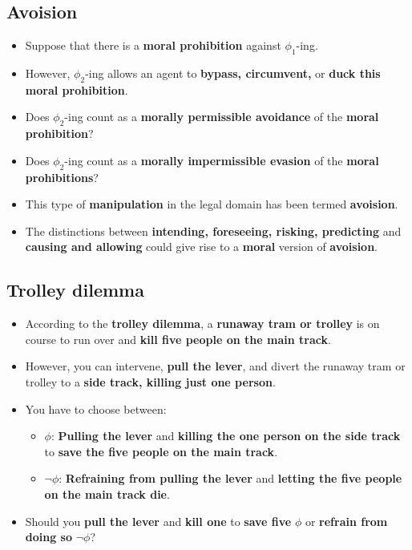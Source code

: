 \documentclass[11pt]{article}
\begin{document}
 \newpage
\subsection{Avoision}
\label{sec:org33f5b64}
\begin{itemize}
\item Suppose that there is a \textbf{moral prohibition} against \(\phi_1\)-ing.
\item However, \(\phi_2\)-ing allows an agent to \textbf{bypass, circumvent,} or \textbf{duck this moral prohibition}.
\item Does \(\phi_2\)-ing count as a \textbf{morally permissible avoidance} of the \textbf{moral prohibition}?
\item Does \(\phi_2\)-ing count as a \textbf{morally impermissible evasion} of the \textbf{moral prohibitions}?
\item This type of \textbf{manipulation} in the legal domain has been termed \textbf{avoision}.
\item The distinctions between \textbf{intending, foreseeing, risking, predicting} and \textbf{causing and allowing} could give rise to a \textbf{moral} version of \textbf{avoision}.
\end{itemize}
\subsection{Trolley dilemma}
\label{sec:org089fe1a}
\begin{itemize}
\item According to the \textbf{trolley dilemma}, a \textbf{runaway tram or trolley} is on course to run over and \textbf{kill five people on the main track}.
\item However, you can intervene, \textbf{pull the lever}, and divert the runaway tram or trolley to a \textbf{side track, killing just one person}.
\item You have to choose between:
\begin{itemize}
\item \(\phi\): \textbf{Pulling the lever} and \textbf{killing the one person on the side track} to \textbf{save the five people on the main track}.
\item \(\neg \phi\): \textbf{Refraining from pulling the lever} and \textbf{letting the five people on the main track die}.
\end{itemize}
\item Should you \textbf{pull the lever} and \textbf{kill one} to \textbf{save five} \(\phi\) or \textbf{refrain from doing so} \(\neg \phi\)?
\end{itemize}
\end{document}
